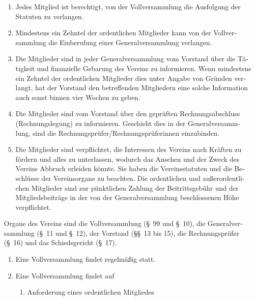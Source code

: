 \begin{otherlanguage}{german}
\begin{enumerate}[statutenenum]
    \item Jedes Mitglied ist berechtigt, von der Vollversammlung die Ausfolgung der Statuten zu verlangen.

    \item Mindestens ein Zehntel der ordentlichen Mitglieder kann von der Vollversammlung die Einberufung einer Generalversammlung verlangen.

    \item Die Mitglieder sind in jeder Generalversammlung vom Vorstand über die Tätigkeit und finanzielle Gebarung des Vereins zu informieren.
        Wenn mindestens ein Zehntel der ordentlichen Mitglieder dies unter Angabe von Gründen verlangt, hat der Vorstand den betreffenden Mitgliedern eine solche Information auch sonst binnen vier Wochen zu geben.

    \item Die Mitglieder sind vom Vorstand über den geprüften Rechnungsabschluss (Rechnungslegung) zu informieren.
        Geschieht dies in der Generalversammlung, sind die Rechnungsprüfer/Rechnungsprüferinnen einzubinden.

    \item Die Mitglieder sind verpflichtet, die Interessen des Vereins nach Kräften zu fördern und alles zu unterlassen, wodurch das Ansehen und der Zweck des Vereins Abbruch erleiden könnte.
        Sie haben die Vereinsstatuten und die Beschlüsse der Vereinsorgane zu beachten.
        Die ordentlichen und außerordentlichen Mitglieder sind zur pünktlichen Zahlung der Beitrittsgebühr und der Mitgliedsbeiträge in der von der Generalversammlung beschlossenen Höhe verpflichtet.
\end{enumerate}


Organe des Vereins sind die Vollversammlung (\S\ 99 und \S\ 10), die Generalversammlung (\S\ 11 und \S\ 12), der Vorstand (\S\S\ 13 bis 15), die Rechnungsprüfer (\S\ 16) und das Schiedsgericht (\S\ 17).


\begin{enumerate}[statutenenum]
    \item Eine Vollversammlung findet regelmäßig statt.

    \item Eine Vollversammlung findet auf
        \begin{enumerate}[statutenenum]
            \item Anforderung eines ordentlichen Mitgliedes


\end{enumerate}
\end{enumerate}
\end{otherlanguage}
